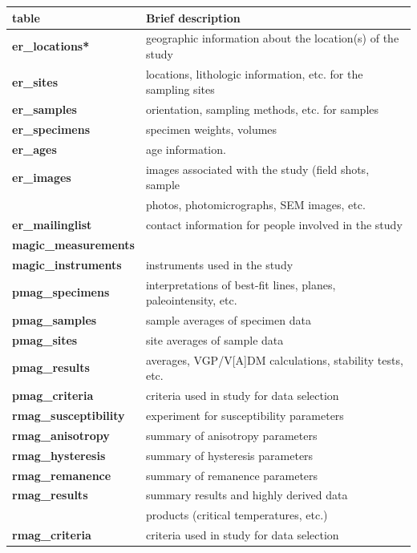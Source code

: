 \documentclass[11pt]{book}
\begin{document}
{{{\begin{tabular}{ll}
\hline
table\qquad &Brief description\\
\hline
{\bf er\_locations*}\qquad & geographic information about the location(s) of the study\\
 {\bf er\_sites}\qquad & locations, lithologic information, etc. for the sampling sites\\
 {\bf er\_samples}\qquad & orientation, sampling methods, etc. for samples\\
  {\bf er\_specimens}\qquad &specimen weights, volumes\\
    {\bf er\_ages}\qquad &age information.\\
    {\bf er\_images}\qquad & images associated with the study (field shots, sample\\
    \qquad &photos, photomicrographs, SEM images, etc.\\
   {\bf er\_mailinglist}\qquad &contact information for people involved in the study\\
   \hline
   {\bf magic\_measurements} \qquad & \hskip 1em measurement data used in the study\\
    {\bf magic\_instruments}\qquad & instruments used in the study\\
       \hline
    {\bf pmag\_specimens}\qquad & interpretations of best-fit lines, planes, paleointensity, etc. \\
{\bf pmag\_samples}\qquad &sample averages of specimen data\\
{\bf pmag\_sites}\qquad & site averages of sample data\\
{\bf pmag\_results}\qquad & averages, VGP/V[A]DM calculations, stability tests, etc.\\
{\bf pmag\_criteria}\qquad &criteria used in study for data selection\\
   \hline
   {\bf rmag\_susceptibility}\qquad &experiment for susceptibility parameters\\
{\bf rmag\_anisotropy}\qquad & summary of anisotropy parameters\\
{\bf rmag\_hysteresis}\qquad & summary of hysteresis parameters\\
{\bf rmag\_remanence}\qquad &summary of remanence parameters\\
{\bf rmag\_results}\qquad &summary results and highly derived data \\
\qquad &products (critical temperatures, etc.)\\
{\bf rmag\_criteria}\qquad &criteria used in study for data selection\\
\hline
\end{tabular}



}}}
\end{document}

